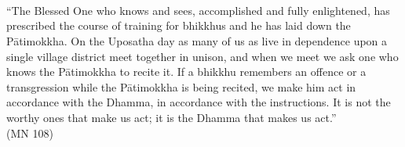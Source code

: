 
\cleartorecto
\thispagestyle{empty}

\ifafiveversion\vspace*{3em}\fi
\ifasixversion\vspace*{3em}\fi

{\centering


  \\[1.0\baselineskip] \fi
  \\[1.2\baselineskip] \fi

  \ifafiveversion {}
    {\Huge\chapterTitleFont\textsc{{\thesubtitle\linebreak}}}\\[0.2\baselineskip] \fi
  \ifasixversion {\fontsize{18}{14}\chapterTitleFont\textsc{{\thesubtitle\linebreak}}}\\[0.2\baselineskip] \fi

  \ifafiveversion {}\\[1.4\baselineskip] \fi
  \ifasixversion {}\\[1.4\baselineskip] \fi

  \\[2.0\baselineskip] \fi
  \\[2.0\baselineskip] \fi

  {\quote ``The Blessed One who knows and sees, accomplished and fully enlightened, has prescribed the course of training for bhikkhus and he has laid down the Pātimokkha. On the Uposatha day as many of us as live in dependence upon a single village district meet together in unison, and when we meet we ask one who knows the Pātimokkha to recite it. If a bhikkhu remembers an offence or a transgression while the Pātimokkha is being recited, we make him act in accordance with the Dhamma, in accordance with the instructions. It is not the worthy ones that make us act; it is the Dhamma that makes us act.''\\ \smallskip (MN 108)}\\[1.4\baselineskip]
}

